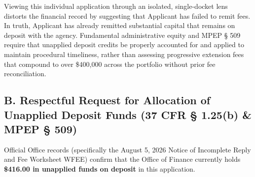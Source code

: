 \documentclass[11pt,letterpaper]{article}
\begin{document}
Viewing this individual application through an isolated, single-docket lens distorts the financial record by suggesting that Applicant has failed to remit fees. In truth, Applicant has already remitted substantial capital that remains on deposit with the agency. Fundamental administrative equity and MPEP \S{} 509 require that unapplied deposit credits be properly accounted for and applied to maintain procedural timeliness, rather than assessing progressive extension fees that compound to over \$400,000 across the portfolio without prior fee reconciliation.

\subsection*{B. Respectful Request for Allocation of Unapplied Deposit Funds (37 CFR \S{} 1.25(b) \& MPEP \S{} 509)}
Official Office records (specifically the August 5, 2026 Notice of Incomplete Reply and Fee Worksheet WFEE) confirm that the Office of Finance currently holds \textbf{\$416.00 in unapplied funds on deposit} in this application.
\end{document}
